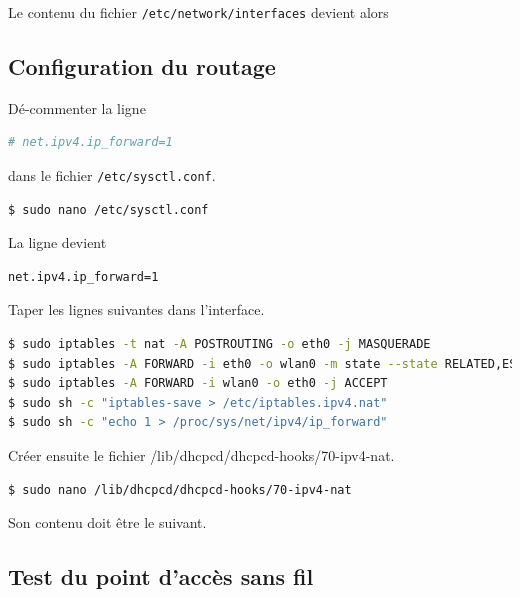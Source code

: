 \documentclass[11pt]{article}
\begin{document}
Le contenu du fichier \lstinline{/etc/network/interfaces} devient alors



\subsection{Configuration du routage}

Dé-commenter la ligne 
\begin{lstlisting}[language=bash]
# net.ipv4.ip_forward=1
\end{lstlisting}
dans le fichier \lstinline{/etc/sysctl.conf}.

\begin{lstlisting}[language=bash]
$ sudo nano /etc/sysctl.conf
\end{lstlisting}

La ligne devient
\begin{lstlisting}[language=bash]
net.ipv4.ip_forward=1
\end{lstlisting}

Taper les lignes suivantes dans l'interface.

\begin{lstlisting}[language=bash]
$ sudo iptables -t nat -A POSTROUTING -o eth0 -j MASQUERADE
$ sudo iptables -A FORWARD -i eth0 -o wlan0 -m state --state RELATED,ESTABLISHED -j ACCEPT
$ sudo iptables -A FORWARD -i wlan0 -o eth0 -j ACCEPT
$ sudo sh -c "iptables-save > /etc/iptables.ipv4.nat"
$ sudo sh -c "echo 1 > /proc/sys/net/ipv4/ip_forward"
\end{lstlisting}

Créer ensuite le fichier {/lib/dhcpcd/dhcpcd-hooks/70-ipv4-nat}.
\begin{lstlisting}[language=bash]
$ sudo nano /lib/dhcpcd/dhcpcd-hooks/70-ipv4-nat
\end{lstlisting}

Son contenu doit être le suivant.



\subsection{Test du point d'accès sans fil}

\end{document}
